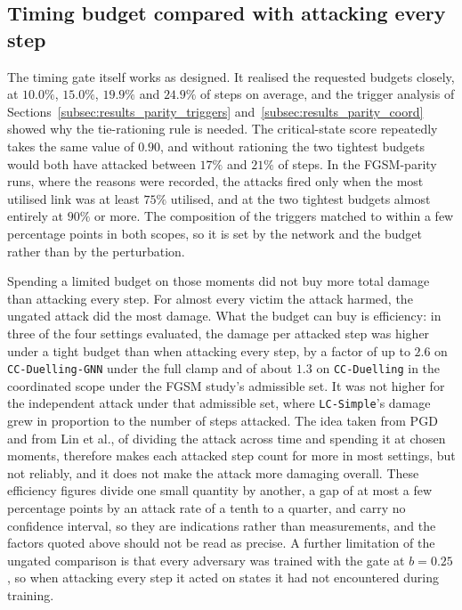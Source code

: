 \subsection{Timing budget compared with attacking every step}
\label{subsec:conclusions_timing}

The timing gate itself works as designed. It realised the requested budgets closely,
at $10.0\%$, $15.0\%$, $19.9\%$ and $24.9\%$ of steps on average, and the trigger
analysis of Sections~\ref{subsec:results_parity_triggers}
and~\ref{subsec:results_parity_coord} showed why the tie-rationing rule is needed. The
critical-state score repeatedly takes the same value of $0.90$, and without rationing
the two tightest budgets would both have attacked between $17\%$ and $21\%$ of steps.
In the FGSM-parity runs, where the reasons were recorded, the attacks fired only when the
most utilised link was at least $75\%$ utilised, and at the two tightest budgets almost
entirely at $90\%$ or more. The composition of the
triggers matched to within a few percentage points in both scopes, so it is set by the
network and the budget rather than by the perturbation.

Spending a limited budget on those moments did not buy more total damage than
attacking every step. For almost every victim the attack harmed, the ungated attack did
the most damage. What the budget can buy is efficiency: in three of the four settings
evaluated, the damage per attacked step was higher under a tight budget than when
attacking every step, by a factor of up to $2.6$ on \texttt{CC-Duelling-GNN} under the
full clamp and of about $1.3$ on \texttt{CC-Duelling} in the coordinated scope under
the FGSM study's admissible set. It was not higher for the independent attack under that
admissible set, where \texttt{LC-Simple}'s damage grew in proportion to the number of
steps attacked. The idea taken from PGD and from Lin et al., of dividing the attack
across time and spending it at chosen moments, therefore
makes each attacked step count for more in most settings, but not reliably, and it does
not make the attack more damaging overall. These efficiency figures divide one small
quantity by another, a gap of at most a few percentage points by an attack rate of a
tenth to a quarter, and carry no confidence interval, so they are indications rather
than measurements, and the factors quoted above should not be read as precise. A further
limitation of the ungated comparison is that every adversary was trained with the gate at
$b = 0.25$, so when attacking every step it acted on states it had not encountered during
training.

